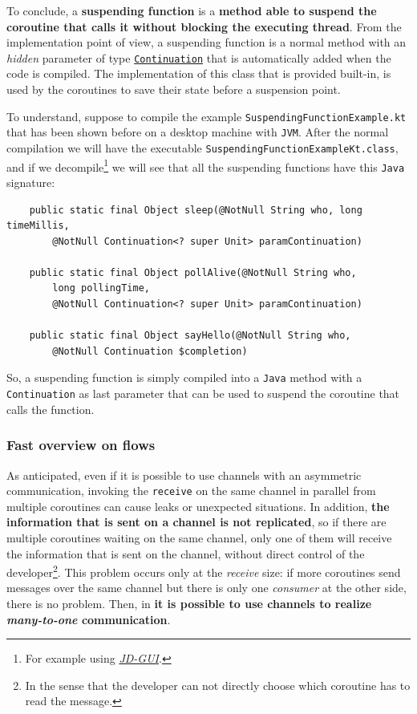 To conclude, a \textbf{suspending function} is a \Kotlin \textbf{method able to suspend the coroutine that calls it without blocking the executing thread}. From the implementation point of view, a suspending function is a normal method with an \textit{hidden} parameter of type \href{https://kotlinlang.org/api/latest/jvm/stdlib/kotlin.coroutines/-continuation/}{\texttt{Continuation}} that is automatically added when the code is compiled. The implementation of this class that is provided built-in, is used by the coroutines to save their state before a suspension point.

To understand, suppose to compile the example \texttt{SuspendingFunctionExample.kt} that has been shown before on a desktop machine with \texttt{JVM}. After the normal \Kotlin compilation we will have the executable \texttt{SuspendingFunctionExampleKt.class}, and if we decompile\footnote{For example using \href{https://java-decompiler.github.io/}{\textit{JD-GUI}}.} we will see that all the suspending functions have this \texttt{Java} signature:

\begin{lstlisting}
	public static final Object sleep(@NotNull String who, long timeMillis,
		@NotNull Continuation<? super Unit> paramContinuation)
		
	public static final Object pollAlive(@NotNull String who,
		long pollingTime,
		@NotNull Continuation<? super Unit> paramContinuation)
		
	public static final Object sayHello(@NotNull String who,
		@NotNull Continuation $completion)
\end{lstlisting}

So, a suspending function is simply compiled into a \texttt{Java} method with a \texttt{Continuation} as last parameter that can be used to suspend the coroutine that calls the function.

\subsubsection{Fast overview on flows}

As anticipated, even if it is possible to use \Kotlin channels with an asymmetric communication, invoking the \texttt{receive} on the same channel in parallel from multiple coroutines can cause leaks or unexpected situations. In addition, \textbf{the information that is sent on a channel is not replicated}, so if there are multiple coroutines waiting on the same channel, only one of them will receive the information that is sent on the channel, without direct control of the developer\footnote{In the sense that the developer can not directly choose which coroutine has to read the message.}.
This problem occurs only at the \textit{receive} size: if more coroutines send messages over the same channel but there is only one \textit{consumer} at the other side, there is no problem. Then, in \Kotlin \textbf{it is possible to use channels to realize \textit{many-to-one} communication}.

